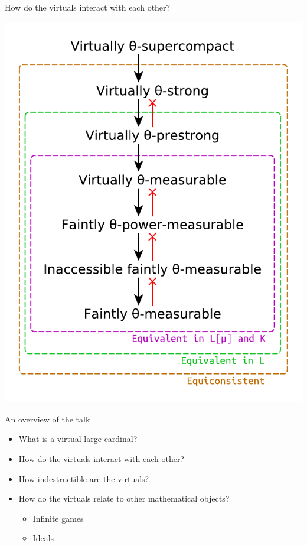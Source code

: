 \documentclass{beamer}
\begin{document}
\begin{frame}{How do the virtuals interact with each other?}
  
  \begin{center}
    \includegraphics[scale=0.55]{gfx/virtual-separations.pdf}
  \end{center}

\end{frame}


\begin{frame}{An overview of the talk}
  \begin{itemize}
    \item What is a virtual large cardinal?
    \item How do the virtuals interact with each other?
    \item<alert@+> How indestructible are the virtuals?
    \item How do the virtuals relate to other mathematical objects?
      \begin{itemize}
        \item Infinite games
        \item Ideals
      \end{itemize}
  \end{itemize}
\end{frame}
\end{document}

